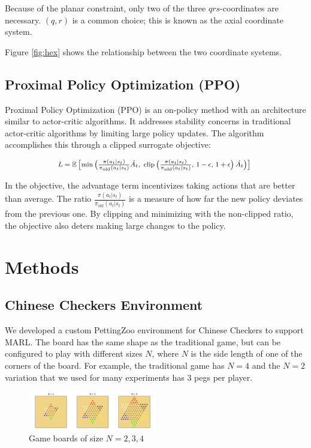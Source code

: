 \documentclass[12pt, a4paper, twocolumn]{article}
\begin{document}
Because of the planar constraint, only two of the three $qrs$-coordinates are necessary. $(q, r)$ is a common choice; this is known as the axial coordinate system.

Figure \ref{fig:hex} shows the relationship between the two coordinate systems.

\subsection{Proximal Policy Optimization (PPO)}

Proximal Policy Optimization\cite{PPO} (PPO) is an on-policy method with an architecture similar to actor-critic algorithms. It addresses stability concerns in traditional actor-critic algorithms by limiting large policy updates. The algorithm accomplishes this through a clipped surrogate objective:

  $$
  \mbox{\footnotesize
  $L = \mathbb{E}\left[\min\left(\frac{\pi(a_t | s_t)}{\pi_{\text{old}}(a_t | s_t)} \hat{A_t}, \text{ clip}\left(\frac{\pi(a_t | s_t)}{\pi_{\text{old}}(a_t | s_t)},\, 1 - \epsilon,\, 1 + \epsilon \right) \hat{A_t}\right)\right]$
  }
  $$

In the objective, the advantage term incentivizes taking actions that are better than average. The ratio $\frac{\pi(a_t | s_t)}{\pi_{\text{old}}(a_t | s_t)}$ is a measure of how far the new policy deviates from the previous one. By clipping and minimizing with the non-clipped ratio, the objective also deters making large changes to the policy. 

\section{Methods}

\subsection{Chinese Checkers Environment}

We developed a custom PettingZoo environment for Chinese Checkers to support MARL. The board has the same shape as the traditional game, but can be configured to play with different sizes $N$, where $N$ is the side length of one of the corners of the board. For example, the traditional game has $N=4$ and the $N = 2$ variation that we used for many experiments has 3 pegs per player.

\begin{figure}
  \centering
    \includegraphics[width=0.5\textwidth]{images/boards.png}
  \caption{Game boards of size $N = 2, 3, 4$}
  \label{fig:boards}
\end{figure}
\end{document}
